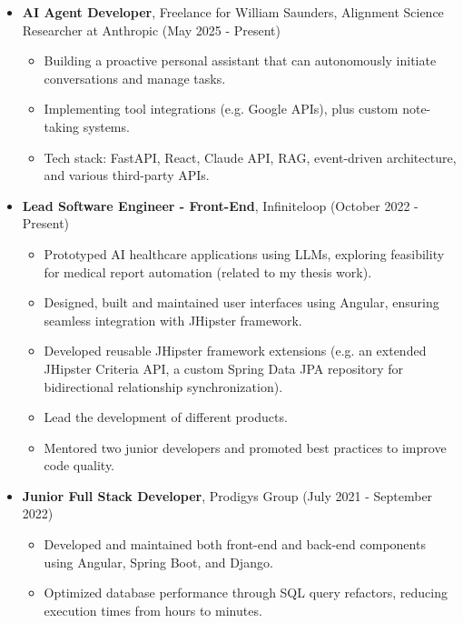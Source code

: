 \documentclass[a4paper,9pt]{article}
\newcommand{\cvsection}[2]{
    \vspace{0.3cm} %
    \noindent {\large \textbf{#1}} %
    \begin{itemize}
        \renewcommand{\labelitemi}{}
        \small #2 %
    \end{itemize}
}
\begin{document}
\cvsection{Professional Experience}{
    \item \textbf{AI Agent Developer}, Freelance for William Saunders, Alignment Science Researcher at Anthropic (May 2025 - Present)
    \begin{itemize}
        \item Building a proactive personal assistant that can autonomously initiate conversations and manage tasks.
        \item Implementing tool integrations (e.g. Google APIs), plus custom note-taking systems.
        \item Tech stack: FastAPI, React, Claude API, RAG, event-driven architecture, and various third-party APIs.
    \end{itemize}
    \item \textbf{Lead Software Engineer - Front-End}, Infiniteloop (October 2022 - Present)
    \begin{itemize}
        \item Prototyped AI healthcare applications using LLMs, exploring feasibility for medical report automation (related to my thesis work).
        \item Designed, built and maintained user interfaces using Angular, ensuring seamless integration with JHipster framework.
        \item Developed reusable JHipster framework extensions (e.g. an extended JHipster Criteria API, a custom Spring Data JPA repository for bidirectional relationship synchronization).
        \item Lead the development of different products. 
        \item Mentored two junior developers and promoted best practices to improve code quality.
    \end{itemize}
    \item \textbf{Junior Full Stack Developer}, Prodigys Group (July 2021 - September 2022)
    \begin{itemize}
        \item Developed and maintained both front-end and back-end components using Angular, Spring Boot, and Django.
        \item Optimized database performance through SQL query refactors, reducing execution times from hours to minutes.
    \end{itemize}
}
\end{document}
